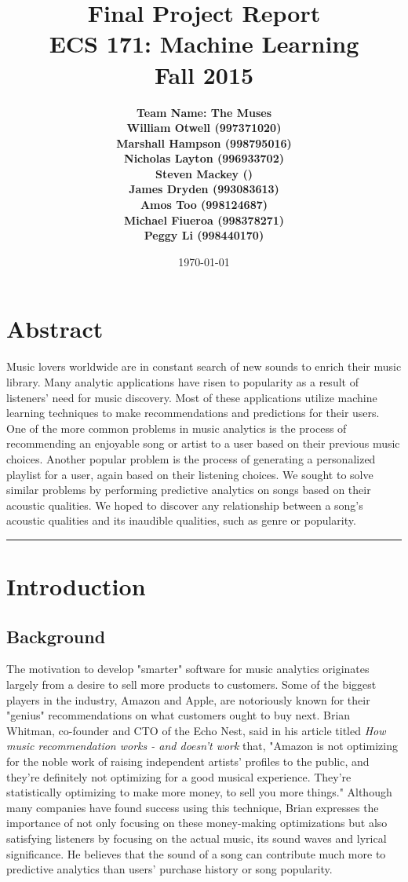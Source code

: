\documentclass[12pt]{article}
\title{\vspace{-3ex}\bf Final Project Report\\[2ex] 
       \normalsize ECS 171: Machine Learning\\Fall 2015}
\date{\today}
\author{\bf Team Name: The Muses\\ \bf William Otwell (997371020)\\ \bf Marshall Hampson (998795016)\\ \bf Nicholas Layton (996933702)\\ \bf Steven Mackey ()\\ \bf James Dryden (993083613)\\ \bf Amos Too (998124687)\\ \bf Michael Fiueroa (998378271)\\ \bf Peggy Li (998440170)}
\newcommand{\horizontalLine}{
	\begin{center}
		\hrule width 1.0\textwidth
	\end{center}
}
\begin{document}
\maketitle
\pagebreak
\tableofcontents
\pagebreak
\section{Abstract}
\label{sec:abstract}
Music lovers worldwide are in constant search of new sounds to enrich their music library. Many analytic applications have risen to popularity as a result of listeners' need for music discovery. Most of these applications utilize machine learning techniques to make recommendations and predictions for their users. One of the more common problems in music analytics is the process of recommending an enjoyable song or artist to a user based on their previous music choices. Another popular problem is the process of generating a personalized playlist for a user, again based on their listening choices. We sought to solve similar problems by performing predictive analytics on songs based on their acoustic qualities. We hoped to discover any relationship between a song's acoustic qualities and its inaudible qualities, such as genre or popularity. 
\horizontalLine
\section{Introduction}
\label{sec:introduction}
\subsection{Background}
\label{subsec:background}
The motivation to develop "smarter" software for music analytics originates largely from a desire to sell more products to customers. Some of the biggest players in the industry, Amazon and Apple, are notoriously known for their "genius" recommendations on what customers ought to buy next. Brian Whitman, co-founder and CTO of the Echo Nest, said in his article titled \textit{How music recommendation works - and doesn't work} that, "Amazon is not optimizing for the noble work of raising independent artists' profiles to the public, and they're definitely not optimizing for a good musical experience. They're statistically optimizing to make more money, to sell you more things." Although many companies have found success using this technique, Brian expresses the importance of not only focusing on these money-making optimizations but also satisfying listeners by focusing on the actual music, its sound waves and lyrical significance. He believes that the sound of a song can contribute much more to predictive analytics than users' purchase history or song popularity.
\end{document}
